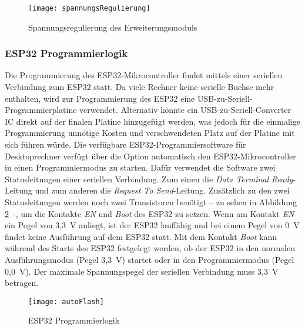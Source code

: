 \begin{figure}[h]
    \centering
    \texttt{[image: spannungsRegulierung]}
    \caption{Spannungsregulierung des Erweiterungsmoduls}
    \label{fig:spannungsRegulierung}
\end{figure}

\subsubsection{ESP32 Programmierlogik}
Die Programmierung des ESP32-Mikrocontroller findet mittels einer seriellen Verbindung zum ESP32 statt. Da viele Rechner keine serielle Buchse mehr enthalten, wird zur Programmierung des ESP32 eine USB-zu-Seriell-Programmierplatine verwendet. Alternativ könnte ein USB-zu-Seriell-Converter \ac{IC} direkt auf der finalen Platine hinzugefügt werden, was jedoch für die einmalige Programmierung unnötige Kosten und verschwendeten Platz auf der Platine mit sich führen würde. Die verfügbare ESP32-Programmiersoftware für Desktoprechner verfügt über die Option automatisch den ESP32-Mikrocontroller in einen Programmiermodus zu starten. Dafür verwendet die Software zwei Statusleitungen einer seriellen Verbindung. Zum einen die \textit{Data Terminal Ready}-Leitung und zum anderen die \textit{Request To Send}-Leitung. Zusätzlich zu den zwei Statusleitungen werden noch zwei Transistoren benötigt -- zu sehen in Abbildung \ref{fig:autoFlash} --, um die Kontakte \textit{EN} und \textit{Boot} des ESP32 zu setzen. Wenn am Kontakt \textit{EN} ein Pegel von 3,3~V anliegt, ist der ESP32 lauffähig und bei einem Pegel von 0~V findet keine Ausführung auf dem ESP32 statt. Mit dem Kontakt \textit{Boot} kann während des Starts des ESP32 festgelegt werden, ob der ESP32 in den normalen Ausführungsmodus (Pegel 3,3~V) startet oder in den Programmiermodus (Pegel 0,0~V). Der maximale Spannungspegel der seriellen Verbindung muss 3,3~V betragen. \cite{espFlashTool}

\begin{figure}[h]
    \centering
    \texttt{[image: autoFlash]}
    \caption{ESP32 Programmierlogik}
    \label{fig:autoFlash}
\end{figure}

